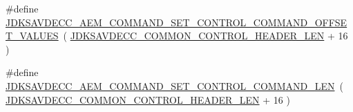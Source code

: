 \begin{DoxyCompactItemize}
\item 
\#define \hyperlink{group__command__set__control_gab7e5956990a2540d796470a682a5397e}{J\+D\+K\+S\+A\+V\+D\+E\+C\+C\+\_\+\+A\+E\+M\+\_\+\+C\+O\+M\+M\+A\+N\+D\+\_\+\+S\+E\+T\+\_\+\+C\+O\+N\+T\+R\+O\+L\+\_\+\+C\+O\+M\+M\+A\+N\+D\+\_\+\+O\+F\+F\+S\+E\+T\+\_\+\+V\+A\+L\+U\+ES}~( \hyperlink{group__jdksavdecc__avtp__common__control__header_gaae84052886fb1bb42f3bc5f85b741dff}{J\+D\+K\+S\+A\+V\+D\+E\+C\+C\+\_\+\+C\+O\+M\+M\+O\+N\+\_\+\+C\+O\+N\+T\+R\+O\+L\+\_\+\+H\+E\+A\+D\+E\+R\+\_\+\+L\+EN} + 16 )
\item 
\#define \hyperlink{group__command__set__control_ga500832fc15eb493007a81a9d07ab06e5}{J\+D\+K\+S\+A\+V\+D\+E\+C\+C\+\_\+\+A\+E\+M\+\_\+\+C\+O\+M\+M\+A\+N\+D\+\_\+\+S\+E\+T\+\_\+\+C\+O\+N\+T\+R\+O\+L\+\_\+\+C\+O\+M\+M\+A\+N\+D\+\_\+\+L\+EN}~( \hyperlink{group__jdksavdecc__avtp__common__control__header_gaae84052886fb1bb42f3bc5f85b741dff}{J\+D\+K\+S\+A\+V\+D\+E\+C\+C\+\_\+\+C\+O\+M\+M\+O\+N\+\_\+\+C\+O\+N\+T\+R\+O\+L\+\_\+\+H\+E\+A\+D\+E\+R\+\_\+\+L\+EN} + 16 )
\end{DoxyCompactItemize}
